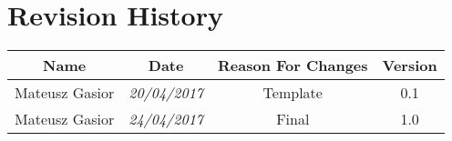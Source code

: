\chapter*{Revision History}

\begin{center}
	\begin{tabular}{|c|c|c|c|}
		\hline
		Name & Date & Reason For Changes & Version\\
		\hline
		Mateusz Gasior & \emph{20/04/2017} & Template & 0.1 \\ \hline
		Mateusz Gasior & \emph{24/04/2017} & Final & 1.0 \\ \hline
		\hline
	\end{tabular}
\end{center}